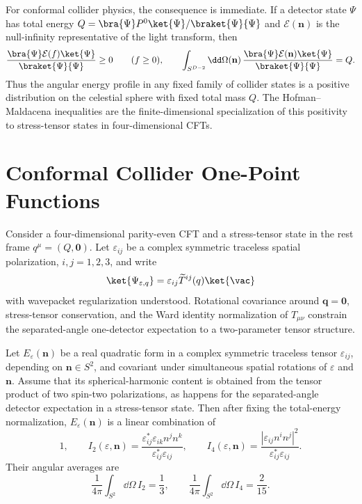 For conformal collider physics, the consequence is immediate.  If a detector
state \(\Psi\) has total energy \(Q=\bra{\Psi}P^0\ket{\Psi}/\braket{\Psi}{\Psi}\)
and \(\mathcal E(\mathbf n)\) is the null-infinity representative of the
light transform, then
\[
  \frac{\bra{\Psi}\mathcal E(f)\ket{\Psi}}{\braket{\Psi}{\Psi}}\geq0
  \qquad (f\geq0),
  \qquad
  \int_{S^{D-2}}\dd\Omega(\mathbf n)\,
  \frac{\bra{\Psi}\mathcal E(\mathbf n)\ket{\Psi}}{\braket{\Psi}{\Psi}}
  =
  Q .
\]
Thus the angular energy profile in any fixed family of collider states is a
positive distribution on the celestial sphere with fixed total mass \(Q\).
The Hofman--Maldacena inequalities are the finite-dimensional specialization
of this positivity to stress-tensor states in four-dimensional CFTs.

\section{Conformal Collider One-Point Functions}

Consider a four-dimensional parity-even CFT and a stress-tensor state in the
rest frame \(q^\mu=(Q,\mathbf0)\).  Let \(\varepsilon_{ij}\) be a complex
symmetric traceless spatial polarization, \(i,j=1,2,3\), and write
\[
  \ket{\Psi_{\varepsilon,q}}
  =
  \varepsilon_{ij}\widetilde T^{ij}(q)\ket{\vac}
\]
with wavepacket regularization understood.  Rotational covariance around
\(\mathbf q=\mathbf0\), stress-tensor conservation, and the Ward identity
normalization of \(T_{\mu\nu}\) constrain the separated-angle one-detector
expectation to a two-parameter tensor structure.

\begin{lemma}
\label{lem:stress-tensor-collider-rotational-basis}
Let \(E_\varepsilon(\mathbf n)\) be a real quadratic form in a complex
symmetric traceless tensor \(\varepsilon_{ij}\), depending on
\(\mathbf n\in S^2\), and covariant under simultaneous spatial rotations of
\(\varepsilon\) and \(\mathbf n\).  Assume that its spherical-harmonic content
is obtained from the tensor product of two spin-two polarizations, as happens
for the separated-angle detector expectation in a stress-tensor state.  Then
after fixing the total-energy normalization, \(E_\varepsilon(\mathbf n)\) is
a linear combination of
\[
  1,\qquad
  I_2(\varepsilon,\mathbf n)
  =
  \frac{\varepsilon^*_{ij}\varepsilon_{ik}n^jn^k}
       {\varepsilon^*_{ij}\varepsilon_{ij}},
  \qquad
  I_4(\varepsilon,\mathbf n)
  =
  \frac{|\varepsilon_{ij}n^in^j|^2}
       {\varepsilon^*_{ij}\varepsilon_{ij}} .
\]
Their angular averages are
\begin{equation}
  \frac{1}{4\pi}\int_{S^2}\dd\Omega\, I_2=\frac13,
  \qquad
  \frac{1}{4\pi}\int_{S^2}\dd\Omega\, I_4=\frac{2}{15}.
  \label{eq:stress-collider-angular-averages}
\end{equation}
\end{lemma}

